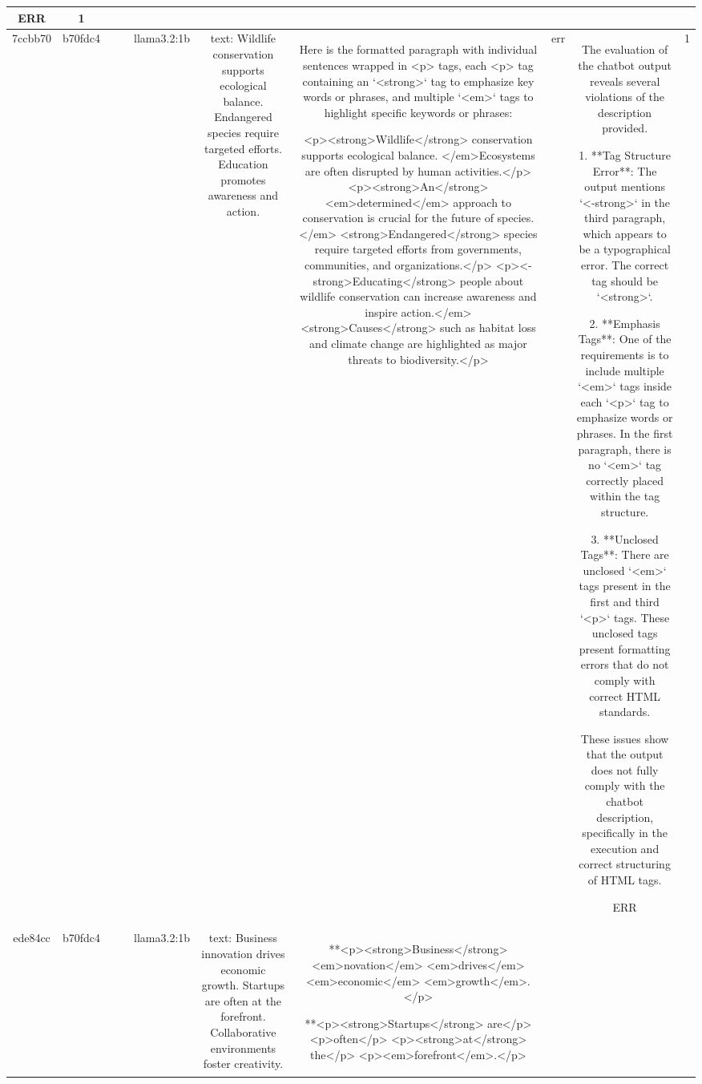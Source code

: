 \begin{table}[h!]
\begin{tabular}{|c|c|c|c|c|c|c|c|c|c|}
ERR & 1\\
\hline
7ccbb70 & b70fdc4 &  &  & llama3.2:1b & text: Wildlife conservation supports ecological balance. Endangered species require targeted efforts. Education promotes awareness and action. & Here is the formatted paragraph with individual sentences wrapped in <p> tags, each <p> tag containing an `<strong>` tag to emphasize key words or phrases, and multiple `<em>` tags to highlight specific keywords or phrases:

<p><strong>Wildlife</strong> conservation supports ecological balance. </em>Ecosystems are often disrupted by human activities.</p>
<p><strong>An</strong><em>determined</em> approach to conservation is crucial for the future of species.</em> <strong>Endangered</strong> species require targeted efforts from governments, communities, and organizations.</p>
<p><-strong>Educating</strong> people about wildlife conservation can increase awareness and inspire action.</em> <strong>Causes</strong> such as habitat loss and climate change are highlighted as major threats to biodiversity.</p> & err & The evaluation of the chatbot output reveals several violations of the description provided.

1. **Tag Structure Error**: The output mentions `<-strong>` in the third paragraph, which appears to be a typographical error. The correct tag should be `<strong>`.

2. **Emphasis Tags**: One of the requirements is to include multiple `<em>` tags inside each `<p>` tag to emphasize words or phrases. In the first paragraph, there is no `<em>` tag correctly placed within the tag structure. 

3. **Unclosed Tags**: There are unclosed `<em>` tags present in the first and third `<p>` tags. These unclosed tags present formatting errors that do not comply with correct HTML standards.

These issues show that the output does not fully comply with the chatbot description, specifically in the execution and correct structuring of HTML tags.

ERR & 1\\
\hline
ede84cc & b70fdc4 &  &  & llama3.2:1b & text: Business innovation drives economic growth. Startups are often at the forefront. Collaborative environments foster creativity. & **<p><strong>Business</strong> <em>novation</em> <em>drives</em> <em>economic</em> <em>growth</em>.</p>

**<p><strong>Startups</strong> are</p> <p>often</p> <p><strong>at</strong> the</p> <p><em>forefront</em>.</p>


\end{tabular}
\end{table}
